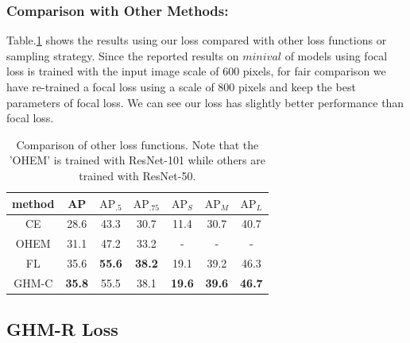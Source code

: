 \documentclass[letterpaper]{article} %
\begin{document}
\subsubsection{Comparison with Other Methods:} Table.\ref{tab:comp} shows the results using our loss compared with other loss functions or sampling strategy. Since the reported results on $minival$ of models using focal loss is trained with the input image scale of 600 pixels, for fair comparison we have re-trained a focal loss using a scale of 800 pixels and keep the best parameters of focal loss.
We can see our loss has slightly better performance than focal loss.
\begin{table}[!ht]
\begin{center}
\begin{tabular}{| c | c  c  c  c  c  c |}
\hline
method & AP & $\text{AP}_{.5}$ & $\text{AP}_{.75}$ & $\text{AP}_{S}$ & $\text{AP}_{M}$ & $\text{AP}_{L}$ \\
\hline
CE & 28.6 & 43.3 & 30.7 & 11.4 & 30.7 & 40.7 \\
OHEM & 31.1 & 47.2 & 33.2 & - & - & - \\
FL & 35.6 & \textbf{55.6} & \textbf{38.2} & 19.1 & 39.2 & 46.3 \\
\hline
GHM-C & \textbf{35.8} & 55.5 & 38.1 & \textbf{19.6} & \textbf{39.6} & \textbf{46.7} \\
\hline
\end{tabular}
\caption{Comparison of other loss functions. Note that the 'OHEM' is trained with ResNet-101 while others are trained with ResNet-50.}
\label{tab:comp}
\end{center}
\end{table}

\subsection{GHM-R Loss}
\end{document}
